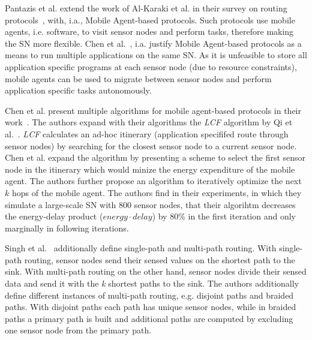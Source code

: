 Pantazis et al. extend the work of Al-Karaki et al. in their survey on routing
protocols~\cite{pantazis2013energy}, with, i.a., Mobile Agent-based protocols.
Such protocols use mobile agents, i.e. software, to visit sensor nodes and
perform tasks, therefore making the \ac{SN} more flexible. Chen et
al.~\cite{chen2007applications}, i.a. justify Mobile Agent-based protocols as a
means to run multiple applications on the same \ac{SN}. As it is unfeasible to
store all application specific programs at each sensor node (due to resource
constraints), mobile agents can be used to migrate between sensor nodes and
perform application specific tasks autonomously.

Chen et al. present multiple algorithms for mobile agent-based protocols in
their work~\cite{chen2011itinerary}. The authors expand with their algorithms
the \textit{LCF} algorithm by Qi et al.~\cite{qi2001optimal}. \textit{LCF}
calculates an ad-hoc itinerary (application specififed route through sensor
nodes) by searching for the closest sensor node to a current sensor node. Chen
et al. expand the algorithm by presenting a scheme to select the first sensor
node in the itinerary which would minize the energy expenditure of the mobile
agent. The authors further propose an algorithm to iteratively optimize the
next $ k $ hops of the mobile agent. The authors find in their experiments, in
which they simulate a large-scale \ac{SN} with 800 sensor nodes, that their
algorihtm decreases the energy-delay product ($ energy \cdot delay $) by 80\%
in the first iteration and only marginally in following iterations.

Singh et al.~\cite{singh2010routing} additionally define single-path and
multi-path routing. With single-path routing, sensor nodes send their sensed
values on the shortest path to the sink. With multi-path routing on the
other hand, sensor nodes divide their sensed data and send it with the
\textit{k} shortest paths to the sink. The authors additionally define
different instances of multi-path routing, e.g. disjoint paths and braided
paths. With disjoint paths each path has unique sensor nodes, while in braided
paths a primary path is built and additional paths are computed by excluding
one sensor node from the primary path.

